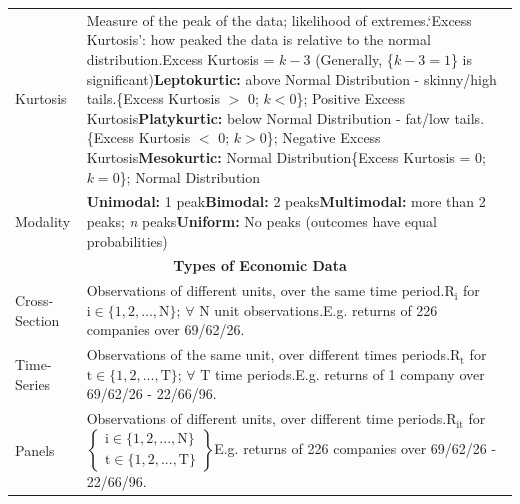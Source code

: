 \documentclass[11pt, english]{article}
\begin{document}
\begin{center}
\begin{longtable}{p{3cm}p{9cm}}
                Kurtosis & Measure of the peak of the data; likelihood of extremes.\newline `Excess Kurtosis’: how peaked the data is relative to the normal distribution.\newline Excess Kurtosis = $k-3$ (Generally, \{$k-3=1$\} is significant)\newline \textbf{Leptokurtic: }above Normal Distribution - skinny/high tails.\newline \{Excess Kurtosis $>$ 0; $k<0$\}; Positive Excess Kurtosis\newline \textbf{Platykurtic: }below Normal Distribution - fat/low tails.\newline \{Excess Kurtosis $<$ 0; $k>0$\}; Negative Excess Kurtosis\newline \textbf{Mesokurtic: }Normal Distribution\newline \{Excess Kurtosis = 0; $k=0$\}; Normal Distribution\\
                Modality & \textbf{Unimodal: }1 peak\newline \textbf{Bimodal: }2 peaks\newline \textbf{Multimodal: }more than 2 peaks; \textit{n} peaks\newline \textbf{Uniform: }No peaks (outcomes have equal probabilities)\\
                \hline
                \hline
                \multicolumn{2}{c}{\textbf{Types of Economic Data}}\\
                \hline
                \hline
                Cross-Section & Observations of different units, over the same time period.\newline $\mathrm{R_i}$ for $\mathrm{i\in\{1,2,...,N\}}$; $\forall$ N unit observations.\newline E.g. returns of 226 companies over 69/62/26.\\
                Time-Series & Observations of the same unit, over different times periods.\newline $\mathrm{R_t}$ for $\mathrm{t\in\{1,2, ...,T\}}$; $\forall$ T time periods.\newline E.g. returns of 1 company over 69/62/26 - 22/66/96.\\
                Panels & Observations of different units, over different time periods.\newline $\mathrm{R_{it}}$ for $\mathrm{\begin{Bmatrix}i\in\{1,2,...,N\}\\t\in\{1,2, ...,T\}\end{Bmatrix}}$\newline E.g. returns of 226 companies over 69/62/26 - 22/66/96.\\
                \hline
        \end{longtable}
        \end{center}
\end{document}
